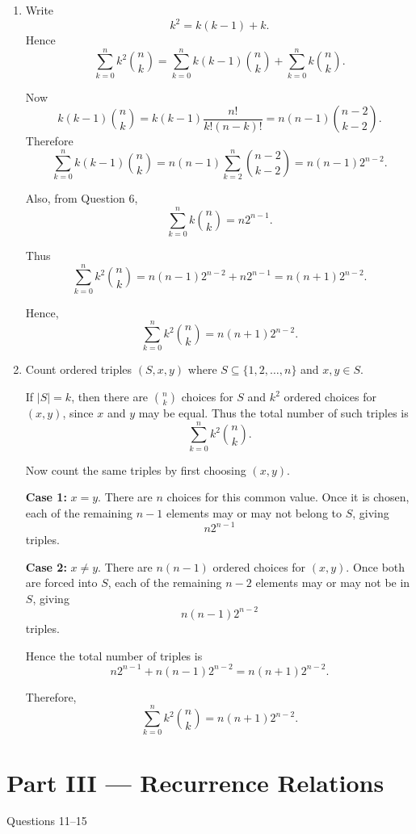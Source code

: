 \documentclass[12pt]{article}
\begin{document}
\begin{enumerate}[label=(\alph*)]
    \item Write
    \[
    k^2=k(k-1)+k.
    \]
    Hence
    \[
    \sum_{k=0}^{n} k^2\binom{n}{k}
    =\sum_{k=0}^{n} k(k-1)\binom{n}{k}+\sum_{k=0}^{n} k\binom{n}{k}.
    \]

    Now
    \[
    k(k-1)\binom{n}{k}
    =k(k-1)\frac{n!}{k!(n-k)!}
    =n(n-1)\binom{n-2}{k-2}.
    \]
    Therefore
    \[
    \sum_{k=0}^{n} k(k-1)\binom{n}{k}
    =n(n-1)\sum_{k=2}^{n}\binom{n-2}{k-2}
    =n(n-1)2^{n-2}.
    \]

    Also, from Question 6,
    \[
    \sum_{k=0}^{n} k\binom{n}{k}=n2^{n-1}.
    \]

    Thus
    \[
    \sum_{k=0}^{n} k^2\binom{n}{k}
    =n(n-1)2^{n-2}+n2^{n-1}
    =n(n+1)2^{n-2}.
    \]

    Hence,
    \[
    \boxed{\sum_{k=0}^{n} k^2\binom{n}{k}=n(n+1)2^{n-2}}.
    \]

    \item Count ordered triples $(S,x,y)$ where $S\subseteq \{1,2,\dots,n\}$ and $x,y\in S$.

    If $|S|=k$, then there are $\binom{n}{k}$ choices for $S$ and $k^2$ ordered choices for $(x,y)$, since $x$ and $y$ may be equal. Thus the total number of such triples is
    \[
    \sum_{k=0}^{n} k^2\binom{n}{k}.
    \]

    Now count the same triples by first choosing $(x,y)$.

    \textbf{Case 1:} $x=y$. There are $n$ choices for this common value. Once it is chosen, each of the remaining $n-1$ elements may or may not belong to $S$, giving
    \[
    n2^{n-1}
    \]
    triples.

    \textbf{Case 2:} $x\ne y$. There are $n(n-1)$ ordered choices for $(x,y)$. Once both are forced into $S$, each of the remaining $n-2$ elements may or may not be in $S$, giving
    \[
    n(n-1)2^{n-2}
    \]
    triples.

    Hence the total number of triples is
    \[
    n2^{n-1}+n(n-1)2^{n-2}=n(n+1)2^{n-2}.
    \]

    Therefore,
    \[
    \boxed{\sum_{k=0}^{n} k^2\binom{n}{k}=n(n+1)2^{n-2}}.
    \]
\end{enumerate}

\newpage
\part{Part  III --- Recurrence Relations}
Questions 11--15
\end{document}
